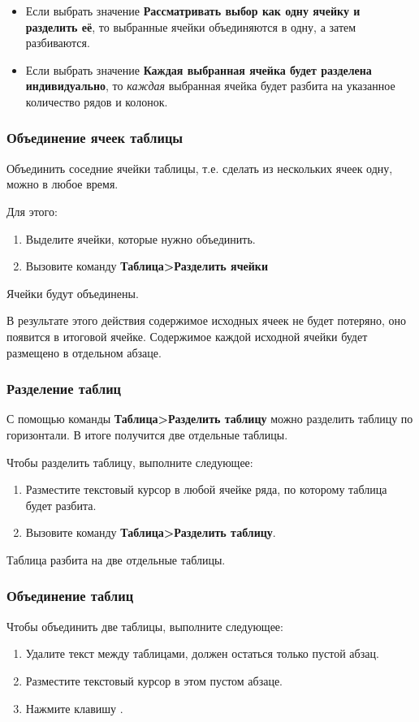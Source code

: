 ﻿\documentclass[a4paper,10pt]{article}
\begin{document}
\begin{itemize}
 \item Если выбрать значение \textbf{Рассматривать выбор как одну ячейку и разделить её}, то выбранные ячейки объединяются в одну, а затем разбиваются.
 \item Если выбрать значение \textbf{Каждая выбранная ячейка будет разделена индивидуально}, то \textit{каждая} выбранная ячейка будет разбита на указанное количество рядов и колонок.
\end{itemize}

\subsubsection{Объединение ячеек таблицы}
Объединить соседние ячейки таблицы, т.е. сделать из нескольких ячеек одну, можно в любое время. 

Для этого:

\begin{enumerate}
 \item Выделите ячейки, которые нужно объединить.
 \item Вызовите команду \textbf{Таблица>Разделить ячейки}
\end{enumerate}

Ячейки будут объединены.

В результате этого действия содержимое исходных ячеек не будет потеряно, оно появится в итоговой ячейке. Содержимое каждой исходной ячейки будет размещено в отдельном абзаце.

\subsubsection{Разделение таблиц}
С помощью команды \textbf{Таблица>Разделить таблицу} можно разделить таблицу по горизонтали. В итоге получится две отдельные таблицы.

Чтобы разделить таблицу, выполните следующее:

\begin{enumerate}
 \item Разместите текстовый курсор в любой ячейке ряда, по которому таблица будет разбита.
 \item Вызовите команду \textbf{Таблица>Разделить таблицу}.
\end{enumerate}

Таблица разбита на две отдельные таблицы.

\subsubsection{Объединение таблиц}
Чтобы объединить две таблицы, выполните следующее:
\begin{enumerate}
 \item Удалите текст между таблицами, должен остаться только пустой абзац.
 \item Разместите текстовый курсор в этом пустом абзаце.
 \item Нажмите клавишу .
\end{enumerate}
\end{document}
